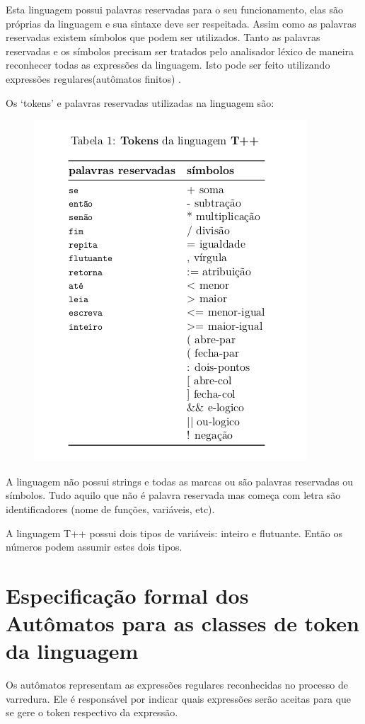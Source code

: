 \documentclass[12pt]{article}
\begin{document}
Esta linguagem possui palavras reservadas para o seu funcionamento, elas são próprias da linguagem e sua sintaxe deve ser respeitada. Assim como as palavras reservadas existem símbolos que podem ser utilizados. Tanto as palavras reservadas e os símbolos precisam ser tratados pelo analisador léxico de maneira reconhecer todas as expressões da linguagem. Isto pode ser feito utilizando expressões regulares(autômatos finitos) \cite{automatos}. 


Os `tokens' e palavras reservadas utilizadas na linguagem são: 
\begin{figure}[H]   
	\centering
	\includegraphics[scale=0.6]{tokens} 
	\label{tab:t1}
\end{figure} 

A linguagem não possui strings e todas as marcas ou são palavras reservadas ou símbolos. Tudo aquilo que não é palavra reservada mas começa com letra são identificadores (nome de funções, variáveis, etc). 

A linguagem T++ possui dois tipos de variáveis: inteiro e flutuante. Então os números podem assumir estes dois tipos. 
\section{Especificação formal dos Autômatos para as classes de token da linguagem} 
\label{sec:sx} 
Os autômatos representam as expressões regulares reconhecidas no processo de varredura. Ele é responsável por indicar quais expressões serão aceitas para que se gere o token respectivo da expressão. 
\end{document}
